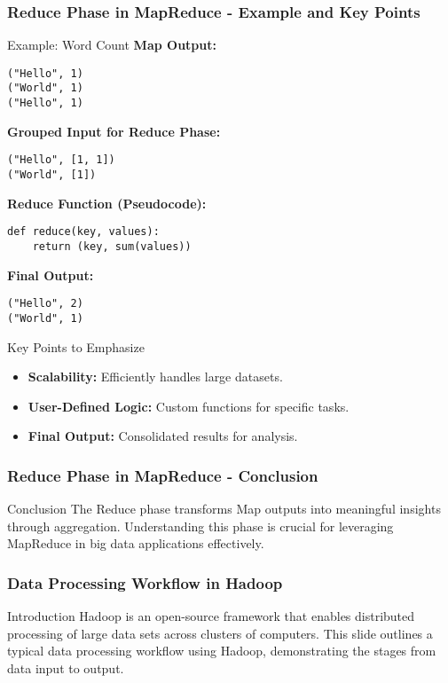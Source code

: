 \documentclass[aspectratio=169]{beamer}
\begin{document}
\begin{frame}[fragile]
    \frametitle{Reduce Phase in MapReduce - Example and Key Points}
    \begin{block}{Example: Word Count}
        \textbf{Map Output:}
        \begin{lstlisting}
("Hello", 1)
("World", 1)
("Hello", 1)
        \end{lstlisting}

        \textbf{Grouped Input for Reduce Phase:}
        \begin{lstlisting}
("Hello", [1, 1])
("World", [1])
        \end{lstlisting}

        \textbf{Reduce Function (Pseudocode):}
        \begin{lstlisting}
def reduce(key, values):
    return (key, sum(values))
        \end{lstlisting}

        \textbf{Final Output:}
        \begin{lstlisting}
("Hello", 2)
("World", 1)
        \end{lstlisting}
    \end{block}
    
    \begin{block}{Key Points to Emphasize}
        \begin{itemize}
            \item \textbf{Scalability:} Efficiently handles large datasets.
            \item \textbf{User-Defined Logic:} Custom functions for specific tasks.
            \item \textbf{Final Output:} Consolidated results for analysis.
        \end{itemize}
    \end{block}
\end{frame}

\begin{frame}[fragile]
    \frametitle{Reduce Phase in MapReduce - Conclusion}
    \begin{block}{Conclusion}
        The Reduce phase transforms Map outputs into meaningful insights through aggregation. Understanding this phase is crucial for leveraging MapReduce in big data applications effectively.
    \end{block}
\end{frame}

\begin{frame}
    \frametitle{Data Processing Workflow in Hadoop}
    \begin{block}{Introduction}
        Hadoop is an open-source framework that enables distributed processing of large data sets across clusters of computers. This slide outlines a typical data processing workflow using Hadoop, demonstrating the stages from data input to output.
    \end{block}
\end{frame}
\end{document}
